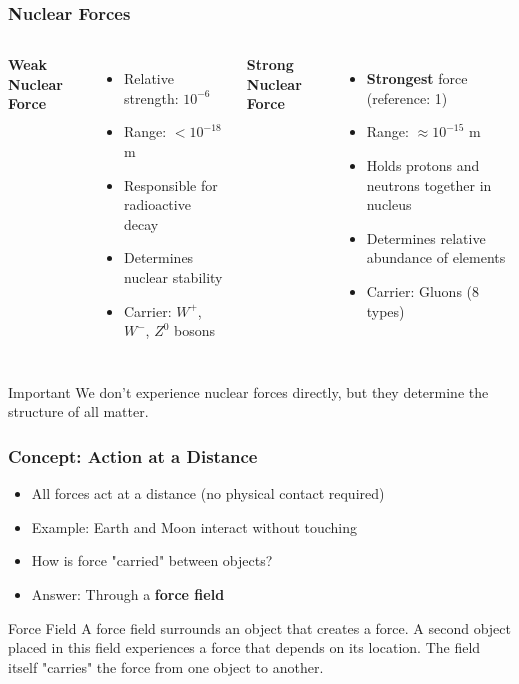 \documentclass{beamer}
\begin{document}
\begin{frame}
\frametitle{Nuclear Forces}
\begin{columns}[T]
\textbf{Weak Nuclear Force}
\begin{itemize}
    \item Relative strength: $10^{-6}$
    \item Range: $< 10^{-18}$ m
    \item Responsible for radioactive decay
    \item Determines nuclear stability
    \item Carrier: $W^+$, $W^-$, $Z^0$ bosons
\end{itemize}

\textbf{Strong Nuclear Force}
\begin{itemize}
    \item \textbf{Strongest} force (reference: 1)
    \item Range: $\approx 10^{-15}$ m
    \item Holds protons and neutrons together in nucleus
    \item Determines relative abundance of elements
    \item Carrier: Gluons (8 types)
\end{itemize}
\end{columns}
\pause
\vspace{1em}
\begin{alertblock}{Important}
We don't experience nuclear forces directly, but they determine the structure of all matter.
\end{alertblock}
\end{frame}

\begin{frame}
\frametitle{Concept: Action at a Distance}
\begin{itemize}
    \item All forces act at a distance (no physical contact required) \pause
    \item Example: Earth and Moon interact without touching \pause
    \item How is force "carried" between objects? \pause
    \item Answer: Through a \textbf{force field}
\end{itemize}
\pause
\begin{block}{Force Field}
A force field surrounds an object that creates a force. A second object placed in this field experiences a force that depends on its location. The field itself "carries" the force from one object to another.
\end{block}
\end{frame}
\end{document}
